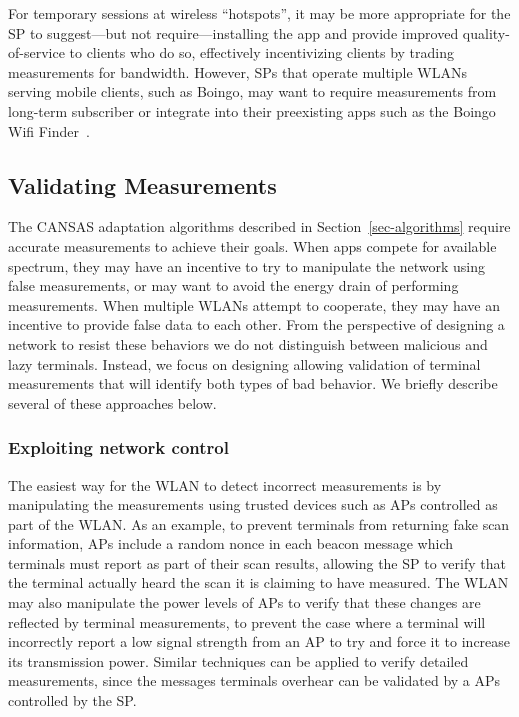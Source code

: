 For temporary sessions at wireless ``hotspots'', it may be more appropriate
for the SP to suggest---but not require---installing the \PS{} app
and provide improved quality-of-service to clients who do so, effectively
incentivizing clients by trading measurements for bandwidth. However, SPs
that operate multiple WLANs serving mobile clients, such as Boingo, may want
to require measurements from long-term subscriber or integrate \PS{}
into their preexisting apps such as the Boingo Wifi
Finder~\cite{boingo-playstore-url}.

\subsection{Validating Measurements}
\label{subsec-validation}

The CANSAS adaptation algorithms described in Section~\ref{sec-algorithms}
require accurate measurements to achieve their goals. When apps compete for
available spectrum, they may have an incentive to try to manipulate the network
using false measurements, or may want to avoid the energy drain of performing
measurements. When multiple WLANs attempt to cooperate, they may have an
incentive to provide false data to each other. From the perspective of designing
a network to resist these behaviors we do not distinguish between malicious and
lazy terminals. Instead, we focus on designing \PS{} allowing validation of
terminal measurements that will identify both types of bad behavior. We briefly
describe several of these approaches below.

\subsubsection{Exploiting network control} The easiest way for the
WLAN to detect incorrect measurements is by manipulating the
measurements using trusted devices such as APs controlled as part of
the WLAN. As an example, to prevent terminals from returning fake scan
information, \PS{} APs include a random nonce in each beacon
message which terminals must report as part of their scan results,
allowing the SP to verify that the terminal actually heard the scan it
is claiming to have measured. The WLAN may also manipulate the power
levels of APs to verify that these changes are reflected by terminal
measurements, to prevent the case where a terminal will incorrectly
report a low signal strength from an AP to try and force it to
increase its transmission power. Similar techniques can be applied to
verify detailed measurements, since the messages terminals overhear
can be validated by a APs controlled by the SP.

